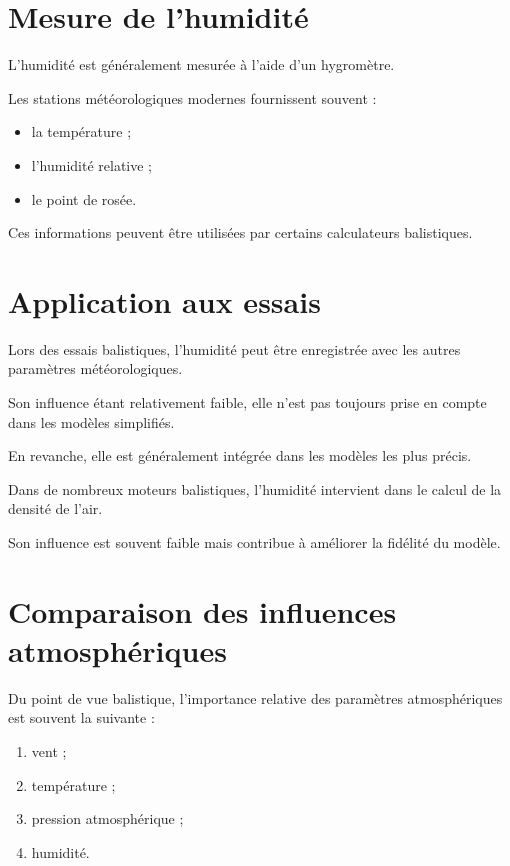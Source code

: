 \section{Mesure de l'humidité}

L'humidité est généralement mesurée à l'aide d'un hygromètre.

Les stations météorologiques modernes fournissent souvent :

\begin{itemize}
\item la température ;
\item l'humidité relative ;
\item le point de rosée.
\end{itemize}

Ces informations peuvent être utilisées par certains calculateurs
balistiques.

\section{Application aux essais}

Lors des essais balistiques, l'humidité peut être enregistrée avec les autres
paramètres météorologiques.

Son influence étant relativement faible, elle n'est pas toujours prise en
compte dans les modèles simplifiés.

En revanche, elle est généralement intégrée dans les modèles les plus
précis.

\begin{simulation}

Dans de nombreux moteurs balistiques, l'humidité intervient dans le calcul de
la densité de l'air.

Son influence est souvent faible mais contribue à améliorer la fidélité du
modèle.

\end{simulation}

\section{Comparaison des influences atmosphériques}

Du point de vue balistique, l'importance relative des paramètres
atmosphériques est souvent la suivante :

\begin{enumerate}
\item vent ;
\item température ;
\item pression atmosphérique ;
\item humidité.
\end{enumerate}


